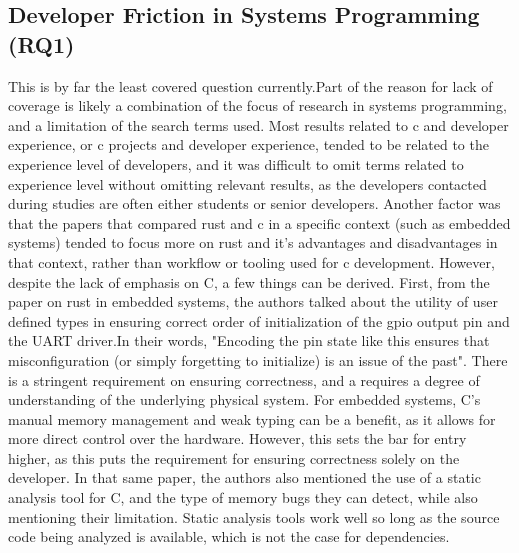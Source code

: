 \documentclass[conference]{IEEEtran}
\begin{document}
{    %

}

\subsection{Developer Friction in Systems Programming (RQ1)}
{
    This is by far the least covered question currently.Part of the reason for lack of coverage is likely a combination of the focus of research in systems programming,
    and a limitation of the search terms used. Most results related to c and developer experience, or c projects and developer experience, tended to be related to the experience level of developers, and it was difficult to omit terms related to experience level without omitting relevant results, as the developers contacted during
    studies are often either students or senior developers. Another factor was that the papers that compared rust and c
    in a specific context (such as embedded systems\cite{nosedaRustSecureIoT2022}) tended to focus more on rust
    and it's advantages and disadvantages in that context, rather than workflow or tooling used for c development. However, despite the lack of emphasis on C, a few things can be
    derived.
}
{
    First, from the paper on rust in embedded systems\cite{nosedaRustSecureIoT2022}, the authors talked about the utility of user defined types in ensuring correct order of initialization of the gpio output pin and the UART driver.In their words, "Encoding the pin state like this ensures that misconfiguration (or simply forgetting to initialize) is an issue of the past". There is a stringent requirement on ensuring correctness, and a requires a degree of understanding of the underlying physical system. For embedded systems, C's manual memory management and weak typing can be a benefit, as it allows for more direct control over the hardware. However, this sets the bar for entry higher, as
    this puts the requirement for ensuring correctness solely on the developer. In that same paper, the authors also mentioned the use of a static analysis tool for C, and the type of memory bugs they can detect, while also mentioning their limitation. Static analysis tools work well so long as the source code being analyzed is available, which is not the case for dependencies.
}
\end{document}
